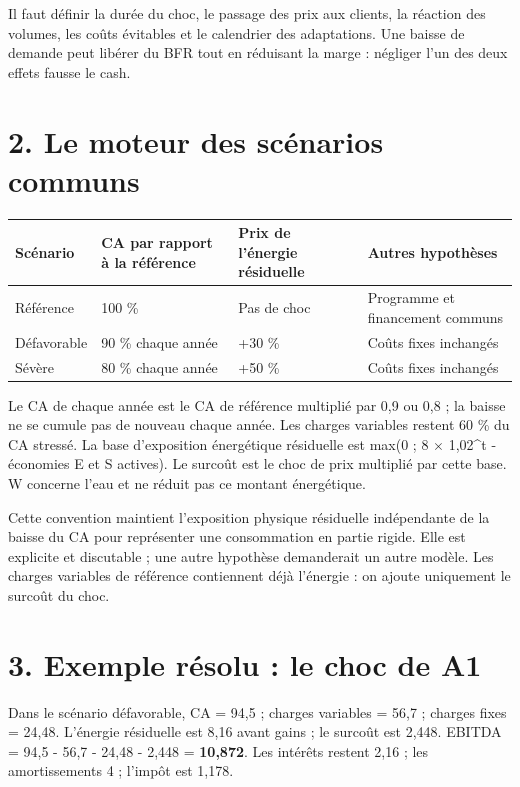 \documentclass[12pt,a4paper]{article}
\begin{document}
Il faut définir la durée du choc, le passage des prix aux clients, la réaction des volumes, les coûts évitables et le calendrier des adaptations. Une baisse de demande peut libérer du BFR tout en réduisant la marge : négliger l’un des deux effets fausse le cash.

\section*{2. Le moteur des scénarios communs}

\Needspace{180pt}
\begin{longtable}{p{3.67cm}p{3.67cm}p{3.67cm}p{3.67cm}}
\toprule
Scénario & CA par rapport à la référence & Prix de l’énergie résiduelle & Autres hypothèses \\
\midrule\endhead
Référence & 100 \% & Pas de choc & Programme et financement communs \\
Défavorable & 90 \% chaque année & +30 \% & Coûts fixes inchangés \\
Sévère & 80 \% chaque année & +50 \% & Coûts fixes inchangés \\
\bottomrule
\end{longtable}

Le CA de chaque année est le CA de référence multiplié par 0,9 ou 0,8 ; la baisse ne se cumule pas de nouveau chaque année. Les charges variables restent 60 \% du CA stressé. La base d’exposition énergétique résiduelle est max(0 ; 8 $\times$ 1,02\textasciicircum{}t - économies E et S actives). Le surcoût est le choc de prix multiplié par cette base. W concerne l’eau et ne réduit pas ce montant énergétique.


Cette convention maintient l’exposition physique résiduelle indépendante de la baisse du CA pour représenter une consommation en partie rigide. Elle est explicite et discutable ; une autre hypothèse demanderait un autre modèle. Les charges variables de référence contiennent déjà l’énergie : on ajoute uniquement le surcoût du choc.

\section*{3. Exemple résolu : le choc de A1}
Dans le scénario défavorable, CA = 94,5 ; charges variables = 56,7 ; charges fixes = 24,48. L’énergie résiduelle est 8,16 avant gains ; le surcoût est 2,448. EBITDA = 94,5 - 56,7 - 24,48 - 2,448 = \textbf{10,872}. Les intérêts restent 2,16 ; les amortissements 4 ; l’impôt est 1,178.
\end{document}
